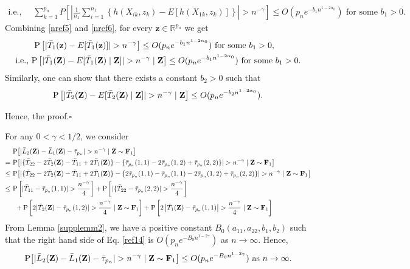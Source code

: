 \documentclass[twoside]{article}
\newcommand{\bZ}{\mathbf{Z}}
\newcommand{\bF}{\mathbf{F}}
\newcommand{\bz}{\mathbf{z}}
\newcommand{\0}{\mathbf{0}}
\newcommand{\1}{\mathbf{1}}
\newcommand*{\QEDB}{\hfill\ensuremath{\square}}
\numberwithin{equation}{section}
\begin{document}
\begin{enumerate}[(a)]
\begin{align}
    \text{i.e., }&\ \sum\limits_{k=1}^{p_n} P\left [\left |\frac{1}{n_1} \sum_{i=1}^{n_1}\left \{ h(X_{ik},z_k) - E[h(X_{1k},z_k)]\right \}\right |> n^{-\gamma}\right ]\leq O(p_n e^{-b_1n^{1-2\alpha_0}})\text{ for some }b_1>0.
\end{align}
Combining \eqref{nref5} and \eqref{nref6}, for every $\bz\in\mathbb{R}^{p_n}$ we get
\begin{align*}
&\ {\rm P}\left [|\bar{T}_{1}(\bz)-E[\bar{T}_{1}(\bz)]|>n^{-\gamma} \right ]\leq O(p_n e^{-b_1 n^{1-2\alpha_0}})\text{ for some }b_1>0,\\
 \text{i.e., }&{\rm P}\left [|\bar{T}_{1}(\bZ)-E[\bar{T}_{1}(\bZ)\mid \bZ]|>n^{-\gamma} \mid \bZ\right ]\leq O(p_n e^{-b_1 n^{1-2\alpha_0}})\text{ for some }b_1>0.
\end{align*}
Similarly, one can show that there exists a constant $b_2>0$ such that
$${\rm P}\left [|\bar{T}_{2}(\bZ)-E[\bar{T}_{2}(\bZ)\mid \bZ]|>n^{-\gamma} \mid \bZ\right ]\leq O(p_n e^{-b_2 n^{1-2\alpha_0}}).$$
\end{enumerate}
Hence, the proof.\hfill\QEDB\newline

For any $0<\gamma<1/2$, we consider
 \begin{align}\label{ref14}
 &\ {\rm P}\big [|\bar{L}_2(\bZ)- \bar{L}_1(\bZ) - \bar{\tau}_{p_n}|>n^{-\gamma}\mid \bZ\sim\bF_1\big ]\nonumber \\
 =&\ {\rm P}\big [|\{\bar{T}_{22} - 2\bar{T}_2(\bZ)- \bar{T}_{11} + 2\bar{T}_1(\bZ)\}
 - \{\bar{\tau}_{p_n}(1,1) - 2\bar{\tau}_{p_n}(1,2) +\bar{\tau}_{p_n}(2,2)\}|>n^{-\gamma}\mid \bZ\sim\bF_1\big ]\nonumber \\
 \leq &\ {\rm P}\big [|\{\bar{T}_{22} - 2\bar{T}_2(\bZ)- \bar{T}_{11} + 2\bar{T}_1(\bZ)\}- \{2\bar{\tau}_{p_n}(1,1) -\bar{\tau}_{p_n}(1,1) - 2\bar{\tau}_{p_n}(1,2) +\bar{\tau}_{p_n}(2,2)\}|>n^{-\gamma}\mid \bZ\sim\bF_1\big ]\nonumber \\
 \leq &\ {\rm P}\left [|\bar{T}_{11}-\bar{\tau}_{p_n}(1,1)|>\frac{n^{-\gamma}}{4}\right ] + {\rm P}\left [|\{\bar{T}_{22} - \bar{\tau}_{p_n}(2,2)|>\frac{n^{-\gamma}}{4}\right ]\nonumber \\
 &\ \ + {\rm P}\left [2|\bar{T}_2(\bZ)- \bar{\tau}_{p_n}(1,2)|>\frac{n^{-\gamma}}{4}\mid \bZ\sim\bF_1\right ]+ {\rm P}\left [2\left |\bar{T}_1(\bZ) - \bar{\tau}_{p_n}(1,1)\right |>\frac{n^{-\gamma}}{4}\mid \bZ\sim\bF_1\right ]
\end{align}
From Lemma \ref{supplemm2}, we have a positive constant $B_0(a_{11},a_{22},b_1,b_2)$ such that the right hand side of Eq. \eqref{ref14} is $O(p_ne^{-B_0n^{1-2\gamma}})$ as $n\to\infty$. Hence,
$${\rm P}\big [|\bar{L}_2(\bZ)- \bar{L}_1(\bZ) - \bar{\tau}_{p_n}|>n^{-\gamma}\mid \bZ\sim\bF_1\big ]\leq O(p_ne^{-B_0n^{1-2\gamma}})\text{ as }n\to\infty.$$
\end{document}
